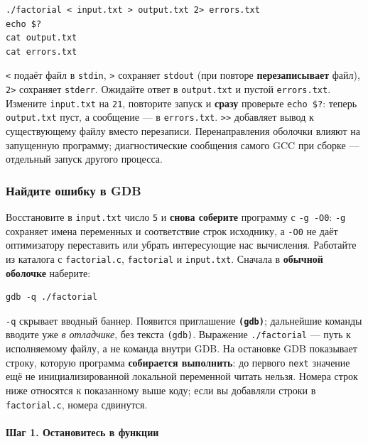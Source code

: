 \begin{verbatim}
./factorial < input.txt > output.txt 2> errors.txt
echo $?
cat output.txt
cat errors.txt
\end{verbatim}

\texttt{\textless{}} подаёт файл в \texttt{stdin},
\texttt{\textgreater{}} сохраняет \texttt{stdout} (при повторе
\textbf{перезаписывает} файл), \texttt{2\textgreater{}} сохраняет
\texttt{stderr}. Ожидайте ответ в \texttt{output.txt} и пустой
\texttt{errors.txt}. Измените \texttt{input.txt} на \texttt{21},
повторите запуск и \textbf{сразу} проверьте \texttt{echo\ \$?}: теперь
\texttt{output.txt} пуст, а сообщение --- в \texttt{errors.txt}.
\texttt{\textgreater{}\textgreater{}} добавляет вывод к существующему
файлу вместо перезаписи. Перенаправления оболочки влияют на запущенную
программу; диагностические сообщения самого GCC при сборке --- отдельный
запуск другого процесса.

\hypertarget{ux43dux430ux439ux434ux438ux442ux435-ux43eux448ux438ux431ux43aux443-ux432-gdb}{%
\subsubsection{Найдите ошибку в
GDB}\label{ux43dux430ux439ux434ux438ux442ux435-ux43eux448ux438ux431ux43aux443-ux432-gdb}}

Восстановите в \texttt{input.txt} число \texttt{5} и \textbf{снова
соберите} программу с \texttt{-g\ -O0}: \texttt{-g} сохраняет имена
переменных и соответствие строк исходнику, а \texttt{-O0} не даёт
оптимизатору переставить или убрать интересующие нас вычисления.
Работайте из каталога с \texttt{factorial.c}, \texttt{factorial} и
\texttt{input.txt}. Сначала в \textbf{обычной оболочке} наберите:

\begin{verbatim}
gdb -q ./factorial
\end{verbatim}

\texttt{-q} скрывает вводный баннер. Появится приглашение
\textbf{\texttt{(gdb)}}; дальнейшие команды вводите уже \emph{в
отладчике}, без текста \texttt{(gdb)}. Выражение \texttt{./factorial}
--- путь к исполняемому файлу, а не команда внутри GDB. На остановке GDB
показывает строку, которую программа \textbf{собирается выполнить}: до
первого \texttt{next} значение ещё не инициализированной локальной
переменной читать нельзя. Номера строк ниже относятся к показанному выше
коду; если вы добавляли строки в \texttt{factorial.c}, номера сдвинутся.

\hypertarget{ux448ux430ux433-1-ux43eux441ux442ux430ux43dux43eux432ux438ux442ux435ux441ux44c-ux432-ux444ux443ux43dux43aux446ux438ux438}{%
\paragraph{Шаг 1. Остановитесь в
функции}\label{ux448ux430ux433-1-ux43eux441ux442ux430ux43dux43eux432ux438ux442ux435ux441ux44c-ux432-ux444ux443ux43dux43aux446ux438ux438}}

